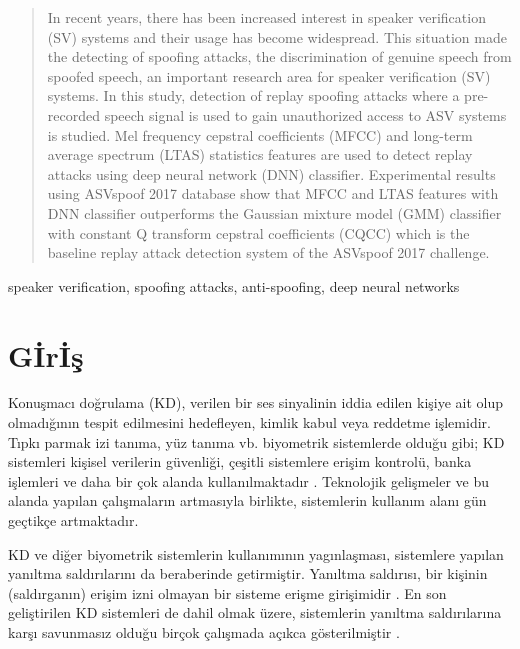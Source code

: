 \documentclass[conference, a4paper]{IEEEtran}
\begin{document}
\begin{abstract}
    In recent years, there has been increased interest in speaker verification (SV) systems and their usage has become
    widespread. This situation made the detecting of spoofing attacks, the discrimination of genuine speech from
    spoofed speech, an important research area for speaker verification (SV) systems. In this study, detection of
    replay spoofing attacks where a pre-recorded speech signal is used to gain unauthorized access to ASV systems is
    studied. Mel frequency cepstral coefficients (MFCC) and long-term average spectrum (LTAS) statistics features are
    used to detect replay attacks using deep neural network (DNN) classifier. Experimental results using ASVspoof 2017
    database show that MFCC and LTAS features with DNN classifier outperforms the Gaussian mixture model (GMM)
    classifier with constant Q transform cepstral coefficients (CQCC) which is the baseline replay attack detection
    system of the ASVspoof 2017 challenge.
\end{abstract}

\begin{IEEEkeywords}
    speaker verification, spoofing attacks, anti-spoofing, deep neural networks
\end{IEEEkeywords}

\IEEEpeerreviewmaketitle

\IEEEpubidadjcol

\section{G{\footnotesize İ}r{\footnotesize İ}ş}
Konuşmacı doğrulama (KD)\cite{kinnunen2010overview}, verilen bir ses sinyalinin iddia edilen kişiye ait
olup olmadığının tespit edilmesini hedefleyen, kimlik kabul veya reddetme işlemidir. Tıpkı parmak izi tanıma, yüz
tanıma vb. biyometrik sistemlerde olduğu gibi; KD sistemleri kişisel verilerin güvenliği, çeşitli sistemlere erişim
kontrolü, banka işlemleri ve daha bir çok alanda kullanılmaktadır \cite{hadid2015biometrics}. Teknolojik gelişmeler ve
bu alanda yapılan çalışmaların artmasıyla birlikte, sistemlerin kullanım alanı gün geçtikçe artmaktadır.

KD ve diğer biyometrik sistemlerin kullanımının yagınlaşması, sistemlere yapılan yanıltma saldırılarını da beraberinde
getirmiştir. Yanıltma saldırısı, bir kişinin (saldırganın) erişim izni olmayan bir sisteme erişme girişimidir
\cite{hadid2015biometrics}. En son geliştirilen KD sistemleri de dahil olmak üzere, sistemlerin yanıltma saldırılarına
karşı savunmasız olduğu birçok çalışmada açıkca gösterilmiştir \cite{wu2015spoofing}.
\end{document}
